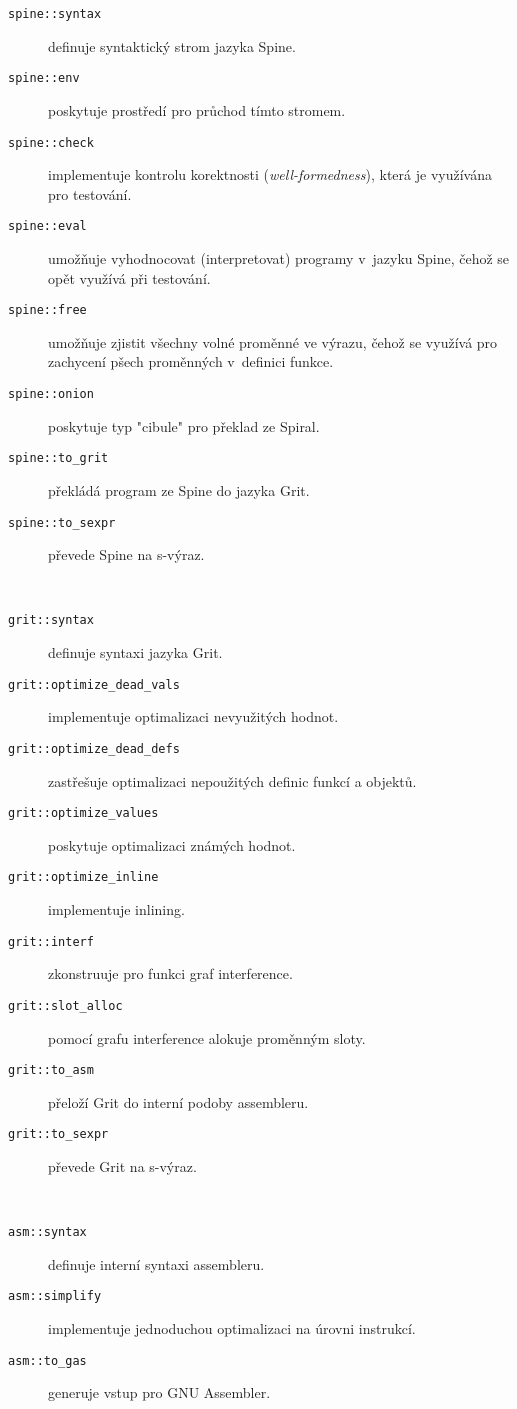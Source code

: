 \begin{description}
  \item[\texttt{spine::syntax}] definuje syntaktický strom jazyka Spine.
  \item[\texttt{spine::env}] poskytuje prostředí pro průchod tímto stromem.
  \item[\texttt{spine::check}] implementuje kontrolu korektnosti
    (\emph{well-formedness}), která je využívána pro testování.
  \item[\texttt{spine::eval}] umožňuje vyhodnocovat (interpretovat) programy
    v~jazyku Spine, čehož se opět využívá při testování.
  \item[\texttt{spine::free}] umožňuje zjistit všechny volné proměnné ve výrazu,
    čehož se využívá pro zachycení pšech proměnných v~definici funkce.
  \item[\texttt{spine::onion}] poskytuje typ "cibule" pro překlad ze Spiral.
  \item[\texttt{spine::to_grit}] překládá program ze Spine do jazyka Grit.
  \item[\texttt{spine::to_sexpr}] převede Spine na s-výraz.
\end{description}
~
\begin{description}
  \item[\texttt{grit::syntax}] definuje syntaxi jazyka Grit.
  \item[\texttt{grit::optimize_dead_vals}] implementuje optimalizaci nevyužitých
    hodnot.
  \item[\texttt{grit::optimize_dead_defs}] zastřešuje optimalizaci nepoužitých
    definic funkcí a objektů.
  \item[\texttt{grit::optimize_values}] poskytuje optimalizaci známých hodnot.
  \item[\texttt{grit::optimize_inline}] implementuje inlining.
  \item[\texttt{grit::interf}] zkonstruuje pro funkci graf interference.
  \item[\texttt{grit::slot_alloc}] pomocí grafu interference alokuje proměnným
    sloty.
  \item[\texttt{grit::to_asm}] přeloží Grit do interní podoby assembleru.
  \item[\texttt{grit::to_sexpr}] převede Grit na s-výraz.
\end{description}
~
\begin{description}
  \item[\texttt{asm::syntax}] definuje interní syntaxi assembleru.
  \item[\texttt{asm::simplify}] implementuje jednoduchou optimalizaci na úrovni
    instrukcí.
  \item[\texttt{asm::to_gas}] generuje vstup pro GNU Assembler.
\end{description}

